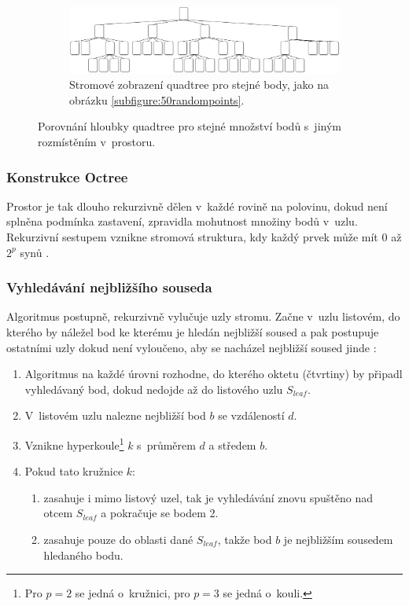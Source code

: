 \begin{figure}[b!]
        \begin{subfigure}[b]{0.8\textwidth}
                     \centering
         \includegraphics[width=\textwidth]{obrazky-figures/octree/octree-good_diagram.drawio.pdf}
         \caption{Stromové zobrazení quadtree pro stejné body, jako na obrázku \ref{subfigure:50randompoints}. }
        \end{subfigure}

        \caption{Porovnání hloubky quadtree pro stejné množství bodů s~jiným rozmístěním v~prostoru. }


        \label{fig:octree_bad_points}
        
        
\end{figure}


\subsubsection{Konstrukce Octree}
Prostor je tak dlouho rekurzivně dělen v~každé rovině na polovinu, dokud není splněna podmínka zastavení, zpravidla mohutnost množiny bodů v~uzlu. Rekurzivní sestupem vznikne stromová struktura, kdy každý prvek může mít $0$ až \(2^p\) synů \cite{octreehash}. 

\subsubsection{Vyhledávání nejbližšího souseda}
Algoritmus postupně, rekurzivně vylučuje uzly stromu. Začne v~uzlu listovém, do kterého by náležel bod ke kterému je hledán nejbližší soused a pak postupuje ostatními uzly dokud není vyloučeno, aby se nacházel nejbližší soused jinde \cite{kdimensiontree}:
\begin{enumerate}
    \item Algoritmus na každé úrovni rozhodne, do kterého oktetu (čtvrtiny) by připadl vyhledávaný bod, dokud nedojde až do listového uzlu $S_{leaf}$.
    \item V~listovém uzlu nalezne nejbližší bod $b$ se vzdáleností $d$.
    \item Vznikne hyperkoule\footnote{Pro $p=2$ se jedná o~kružnici, pro $p=3$ se jedná o~kouli. } $k$ s~průměrem $d$ a středem $b$. 
    \item Pokud tato kružnice $k$:
    \begin{enumerate}
        \item zasahuje i mimo listový uzel, tak je vyhledávání znovu spuštěno nad otcem $S_{leaf}$ a pokračuje se bodem 2.
        \item zasahuje pouze do oblasti dané $S_ {leaf}$, takže bod $b$ je nejbližším sousedem hledaného bodu.
    \end{enumerate}
\end{enumerate}
 

